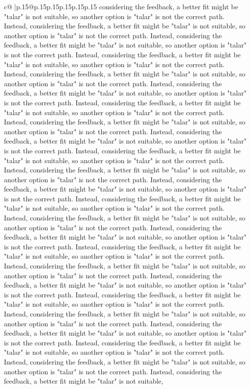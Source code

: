 \documentclass{article}
\begin{document}
{\begin{supertabular}{c@{$\;$}|p{.15\linewidth}@{}p{.15\linewidth}p{.15\linewidth}p{.15\linewidth}p{.15\linewidth}p{.15\linewidth}}
{{{considering the feedback, a better fit might be "talar" is not suitable, so another option is "talar" is not the correct path. Instead, considering the feedback, a better fit might be "talar" is not suitable, so another option is "talar" is not the correct path. Instead, considering the feedback, a better fit might be "talar" is not suitable, so another option is "talar" is not the correct path. Instead, considering the feedback, a better fit might be "talar" is not suitable, so another option is "talar" is not the correct path. Instead, considering the feedback, a better fit might be "talar" is not suitable, so another option is "talar" is not the correct path. Instead, considering the feedback, a better fit might be "talar" is not suitable, so another option is "talar" is not the correct path. Instead, considering the feedback, a better fit might be "talar" is not suitable, so another option is "talar" is not the correct path. Instead, considering the feedback, a better fit might be "talar" is not suitable, so another option is "talar" is not the correct path. Instead, considering the feedback, a better fit might be "talar" is not suitable, so another option is "talar" is not the correct path. Instead, considering the feedback, a better fit might be "talar" is not suitable, so another option is "talar" is not the correct path. Instead, considering the feedback, a better fit might be "talar" is not suitable, so another option is "talar" is not the correct path. Instead, considering the feedback, a better fit might be "talar" is not suitable, so another option is "talar" is not the correct path. Instead, considering the feedback, a better fit might be "talar" is not suitable, so another option is "talar" is not the correct path. Instead, considering the feedback, a better fit might be "talar" is not suitable, so another option is "talar" is not the correct path. Instead, considering the feedback, a better fit might be "talar" is not suitable, so another option is "talar" is not the correct path. Instead, considering the feedback, a better fit might be "talar" is not suitable, so another option is "talar" is not the correct path. Instead, considering the feedback, a better fit might be "talar" is not suitable, so another option is "talar" is not the correct path. Instead, considering the feedback, a better fit might be "talar" is not suitable, so another option is "talar" is not the correct path. Instead, considering the feedback, a better fit might be "talar" is not suitable, so another option is "talar" is not the correct path. Instead, considering the feedback, a better fit might be "talar" is not suitable, so another option is "talar" is not the correct path. Instead, considering the feedback, a better fit might be "talar" is not suitable, so another option is "talar" is not the correct path. Instead, considering the feedback, a better fit might be "talar" is not suitable, so another option is "talar" is not the correct path. Instead, considering the feedback, a better fit might be "talar" is not suitable, so another option is "talar" is not the correct path. Instead, considering the feedback, a better fit might be "talar" is not suitable, }}}
\end{supertabular}}
\end{document}

